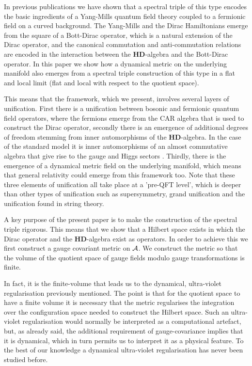 \documentclass[letterpaper,12pt]{article}
\def\ca{{\cal A}}
\begin{document}
In previous publications \cite{Aastrup:2017atr,Aastrup:2019yui,Aastrup:2020jcf} we have shown that a spectral triple of this type encodes the basic ingredients of a Yang-Mills quantum field theory coupled to a fermionic field on a curved background. The Yang-Mills and the Dirac Hamiltonians emerge from the square of a Bott-Dirac operator, which is a natural extension of the Dirac operator, and the canonical commutation and anti-commutation relations are encoded in the interaction between the $\mathbf{HD}$-algebra and the Bott-Dirac operator. In this paper we show how a dynamical metric on the underlying manifold also emerges from a spectral triple construction of this type in a flat and local limit (flat and local with respect to the quotient space). 






 This means that the framework, which we present, involves several layers of unification. First there is a unification between bosonic and fermionic quantum field operators, where the fermions emerge from the CAR algebra that is used to construct the Dirac operator, secondly there is an emergence of additional degrees of freedom stemming from inner automorphisms of the $\mathbf{HD}$-algebra. In the case of the standard model it is inner automorphisms of an almost commutative algebra that give rise to the gauge and Higgs sectors \cite{Connes:2006qj,Chamseddine:1991qh,Chamseddine:2006ep}. Thirdly, there is the emergence of a dynamical metric field on the underlying manifold, which means that general relativity could emerge from this framework too.   
Note that these three elements of unification all take place at a 'pre-QFT level', which is deeper than other types of unification such as supersymmetry, grand unification and the unification found in string theory.



A key purpose of the present paper is to make  the construction of the  spectral triple rigorous. This means that we show that a Hilbert space exists in which the Dirac operator and the $\mathbf{HD}$-algebra exist as operators. In order to achieve this we first construct a gauge covariant metric on $\ca$. We construct the metric so that the volume of the quotient space of gauge fields modulo gauge transformations is finite. 

In fact, it is the finite-volume  that leads us to the dynamical, ultra-violet regularisation previously mentioned.
The point is that for the quotient space to have a finite volume it is necessary that the metric regularises the integration over the configuration space needed to construct the Hilbert space. Such an ultra-violet regularisation would normally be interpreted as a computational artefact, but, as already said, the additional requirement of gauge-covariance implies that it is dynamical, which in turn permits us to interpret it as a physical feature.
 To the best of our knowledge a dynamical ultra-violet regularisation has never been studied before.
\end{document}
